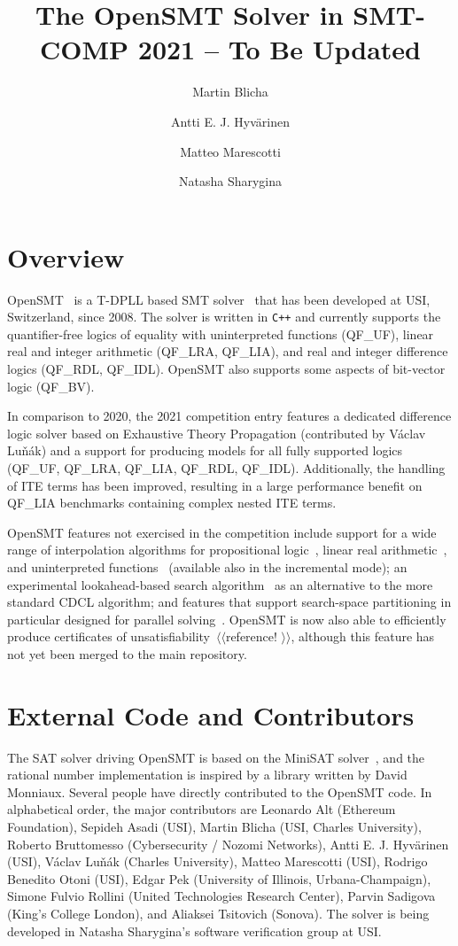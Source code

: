 \documentclass{easychair}
\title{The OpenSMT Solver in SMT-COMP 2021 -- To Be Updated}
\author{
Martin Blicha \and 
Antti E. J. Hyv{\"a}rinen \and
Matteo Marescotti \and
Natasha Sharygina \\
}
\institute{Universit{\`a} della Svizzera italiana (USI), Lugano,
Switzerland}
\date{}
\newcommand{\todo}[1]{$\langle\langle$#1 $\rangle\rangle$}
\newcommand{\qflra}{QF\_LRA}
\newcommand{\qflia}{QF\_LIA}
\newcommand{\qfuf}{QF\_UF}
\newcommand{\qfbv}{QF\_BV}
\newcommand{\qfrdl}{QF\_RDL}
\newcommand{\qfidl}{QF\_IDL}
\begin{document}
\maketitle

\section{Overview}

OpenSMT~\cite{HyvarinenMAS16} is a T-DPLL based SMT
solver~\cite{NieuwenhuisOT:JACM06} that has been developed at USI,
Switzerland, since 2008.  The solver is written in {\tt C++} and
currently supports the quantifier-free logics of equality with
uninterpreted functions (\qfuf), linear real and integer arithmetic (\qflra, \qflia), and real and integer difference logics (\qfrdl, \qfidl).
OpenSMT also supports some aspects of bit-vector logic (\qfbv).

In comparison to 2020, the 2021 competition entry features a dedicated difference logic solver based on Exhaustive Theory Propagation \cite{Nieuwenhuis_2005} (contributed by V{\'a}clav Lu{\v n}{\'a}k) and a support for producing models for all fully supported logics (\qfuf, \qflra, \qflia, \qfrdl, \qfidl).
Additionally, the handling of ITE terms has been improved, resulting in a large performance benefit on \qflia{} benchmarks containing complex nested ITE terms.


OpenSMT features not exercised in the competition include support for a
wide range of interpolation algorithms for propositional
logic~\cite{AltFHS:VSTTE2015}, linear real
arithmetic~\cite{BlichaHKS19}, and uninterpreted
functions~\cite{AltHAS:FMCAD17} (available also in the incremental mode); an experimental look\-ahead-based
search algorithm~\cite{HyvarinenMSCS18} as an alternative to the more
standard CDCL algorithm; and features that support search-space
partitioning in particular designed for parallel
solving~\cite{HyvarinenMS:SAT15}.
OpenSMT is now also able to efficiently produce certificates of unsatisfiability~\cite{}\todo{\color{red}reference!\color{black}}, although this feature has not yet been merged to the main repository.

\section{External Code and Contributors}

The SAT solver driving OpenSMT is based on the MiniSAT
solver~\cite{EenS:SAT03}, and the rational number implementation is
inspired by a library written by David Monniaux.  Several people have
directly contributed to the OpenSMT code.  In alphabetical order, the
major contributors are
%
Leonardo Alt (Ethereum Foundation),
Sepideh Asadi (USI),
Martin Blicha (USI, Charles University),
Roberto Bruttomesso (Cybersecurity / Nozomi Networks),
Antti E. J. Hyv{\"a}rinen (USI),
V{\'a}clav Lu{\v n}{\'a}k (Charles University),
Matteo Marescotti (USI),
Rodrigo Benedito Otoni (USI),
Edgar Pek (University of Illinois, Urbana-Champaign),
Simone Fulvio Rollini (United Technologies Research Center),
Parvin Sadigova (King's College London), and
Aliaksei Tsitovich (Sonova).
%
The solver is being developed in Natasha Sharygina's software
verification group at USI.
\end{document}
